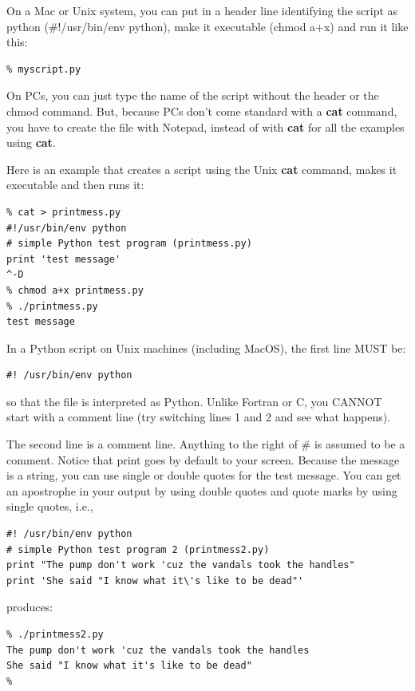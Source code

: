 \documentclass[11pt]{book}
\begin{document}
{{{On a Mac or Unix system,  you can put in a header line identifying the script as python (\#!/usr/bin/env python), make  it executable (chmod a+x)  and   run it like this:

{ \color{blue} \begin{verbatim}
% myscript.py
\end{verbatim}}

On PCs, you can just type the name of the script without the header or the chmod command.   But, because PCs don't come standard with a {\bf cat} command, you have to create the file with Notepad, instead of with {\bf cat} for all the examples using {\bf cat}.  

Here is an example that creates a script using the Unix {\bf cat} command, makes it executable and then runs it:

{ \color{blue} \begin{verbatim}
% cat > printmess.py
#!/usr/bin/env python
# simple Python test program (printmess.py)
print 'test message'
^-D
% chmod a+x printmess.py
% ./printmess.py
test message
\end{verbatim}}

\noindent
In a Python script on Unix machines (including MacOS), the  first line MUST be: 

{ \color{blue} \begin{verbatim}
#! /usr/bin/env python
\end{verbatim}}

\noindent
so that the file is interpreted as Python.  Unlike Fortran or C, you CANNOT start with a
comment line (try switching lines 1 and 2 and see what happens). 

The second line is a comment line.  Anything to the right of \# is assumed to be a comment.
Notice that print goes by default to your screen.  Because the message is a string, you can use single or double quotes
for the test message.  You can get an apostrophe in your output by using double quotes
and quote marks by using single quotes, i.e.,

{ \color{blue} \begin{verbatim}
#! /usr/bin/env python
# simple Python test program 2 (printmess2.py)
print "The pump don't work 'cuz the vandals took the handles"
print 'She said "I know what it\'s like to be dead"'
\end{verbatim}}

\noindent
produces:

{ \color{blue} \begin{verbatim}
% ./printmess2.py
The pump don't work 'cuz the vandals took the handles
She said "I know what it's like to be dead"
%
\end{verbatim}}

}}}
\end{document}
